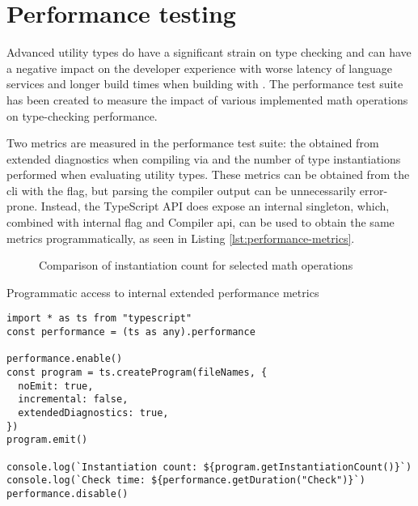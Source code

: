 \section{Performance testing}

Advanced utility types do have a significant strain on type checking and can have a negative impact on the developer experience with worse latency of language services and longer build times when building with . The performance test suite has been created to measure the impact of various implemented math operations on type-checking performance.

Two metrics are measured in the performance test suite: the  obtained from extended diagnostics when compiling via  and the number of type instantiations performed when evaluating utility types. These metrics can be obtained from the  \acrshort{cli} with the  flag, but parsing the compiler output can be unnecessarily error-prone. Instead, the TypeScript API does expose an internal  singleton, which, combined with internal  flag and Compiler \acrshort{api}, can be used to obtain the same metrics programmatically, as seen in Listing \ref{lst:performance-metrics}.

\begin{figure}[ht]
  \centering
  \resizebox{\textwidth}{!}{}
  \caption{Comparison of instantiation count for selected math operations}
  \label{fig:instantiation-count}
\end{figure}


\begin{listing}[ht]
  \caption{Programmatic access to internal extended performance metrics}\label{lst:performance-metrics}
  \begin{verbatim}
import * as ts from "typescript"
const performance = (ts as any).performance

performance.enable()
const program = ts.createProgram(fileNames, {
  noEmit: true,
  incremental: false,
  extendedDiagnostics: true,
})
program.emit()

console.log(`Instantiation count: ${program.getInstantiationCount()}`)
console.log(`Check time: ${performance.getDuration("Check")}`)
performance.disable()
\end{verbatim}
\end{listing}



